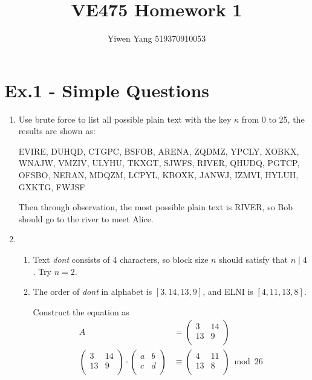 \documentclass[12pt]{article}
\title{VE475 Homework 1}
\author{Yiwen Yang 519370910053}
\begin{document}
\date{}
\maketitle

\section*{Ex.1 - Simple Questions}

\begin{enumerate}
	\item Use brute force to list all possible plain text with the key $\kappa$ from 0 to 25, the results are shown as:

	EVIRE, DUHQD, CTGPC, BSFOB, ARENA, ZQDMZ, YPCLY, XOBKX, WNAJW, VMZIV, ULYHU, TKXGT, SJWFS, RIVER, QHUDQ, PGTCP, OFSBO, NERAN, MDQZM, LCPYL, KBOXK, JANWJ, IZMVI, HYLUH, GXKTG, FWJSF

	Then through observation, the most possible plain text is RIVER, so Bob should go to the river to meet Alice.

	\item 
	\begin{enumerate}
		\item Text {\it dont} consists of 4 characters, so block size $n$ should satisfy that $n \mid 4$. Try $n=2$.
		\item The order of {\it dont} in alphabet is $[3,14,13,9]$, and ELNI is $[4,11,13,8]$. 

		Construct the equation as
		\begin{align*}
			A &=
			\begin{pmatrix}
				3 & 14\\
				13 & 9\\
			\end{pmatrix}
			\\
			\begin{pmatrix}
				3 & 14\\
				13 & 9\\
			\end{pmatrix}
			\cdot
			\begin{pmatrix}
				a & b\\
				c & d\\
			\end{pmatrix}
			&\equiv
			\begin{pmatrix}
				4 & 11\\
				13 & 8\\
			\end{pmatrix}
			\bmod 26
		\end{align*}


\end{enumerate}
\end{enumerate}
\end{document}
